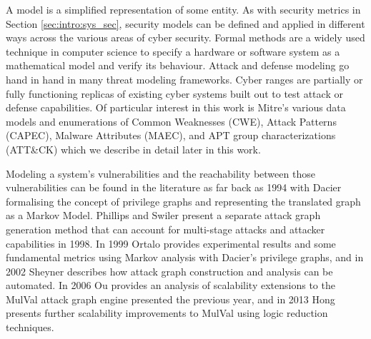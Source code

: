 

A model is a simplified representation of some entity. As with security metrics in Section \ref{sec:intro:sys_sec}, security models can be defined and applied in different ways across the various areas of cyber security. Formal methods are a widely used technique in computer science to specify a hardware or software system as a mathematical model and verify its behaviour\cite{Bell_LaPadula_1973}. Attack and defense modeling go hand in hand in many\cite{Duggan_Michalski, Ellison, Hutchins_Cloppert_Amin, Morana_2015, Schneier_1999, Schoenfield, Shostack, Woodard_Veitch_Thomas_Duggan_2007} threat modeling frameworks. Cyber ranges\cite{Costa_Russo_Armando} are partially or fully functioning replicas of existing cyber systems built out to test attack or defense capabilities.  Of particular interest in this work is Mitre's various\cite{Corporation} data models and enumerations of Common Weaknesses (CWE), Attack Patterns (CAPEC), Malware Attributes (MAEC), and APT group characterizations (ATT\&CK) which we describe in detail later in this work. 

Modeling a system's vulnerabilities and the reachability between those vulnerabilities can be found in the literature as far back as 1994 with Dacier\cite{Dacier_1994} formalising the concept of privilege graphs and representing the translated graph as a Markov Model. Phillips and Swiler\cite{Phillips_Swiler_1998} present a separate attack graph generation method that can account for multi-stage attacks and attacker capabilities in 1998. In 1999 Ortalo\cite{Ortalo_1999}  provides experimental results and some fundamental metrics using Markov analysis with Dacier's privilege graphs, and in 2002 Sheyner\cite{Sheyner_Haines_Jha_Lippmann_Wing_2002} describes how attack graph construction and analysis can be automated. In 2006 Ou\cite{Ou_Boyer_McQueen_2006} provides an analysis of scalability extensions to the MulVal\cite{Ou_Govindavajhala_Appel} attack graph engine presented the previous year, and in 2013 Hong\cite{Hong_Kim_Takaoka_2013} presents further scalability improvements to MulVal using logic reduction techniques. 

